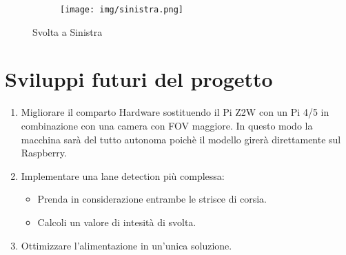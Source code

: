 \documentclass{article}
\begin{document}
\begin{figure}[h!]
    \centering
    \begin{subfigure}[b]{0.8\linewidth}
        \centering
        \texttt{[image: img/sinistra.png]}
        \label{fig:sinistra}
    \end{subfigure}
    \caption{Svolta a Sinistra}
    \label{fig:posizione-sinistra}
\end{figure}

\newpage

\section{Sviluppi futuri del progetto}
\begin{enumerate}
\item Migliorare il comparto Hardware sostituendo il Pi Z2W con un Pi 4/5 in combinazione con una camera con FOV maggiore. In questo modo la macchina sarà del tutto autonoma poichè il modello girerà direttamente sul Raspberry.
\item Implementare una lane detection più complessa:
    \begin{itemize}
    \item Prenda in considerazione entrambe le strisce di corsia.
    \item Calcoli un valore di intesità di svolta.
    \end{itemize}
\item Ottimizzare l'alimentazione in un'unica soluzione.
\end{enumerate}

\newpage

\medskip


\printbibliography
\end{document}

